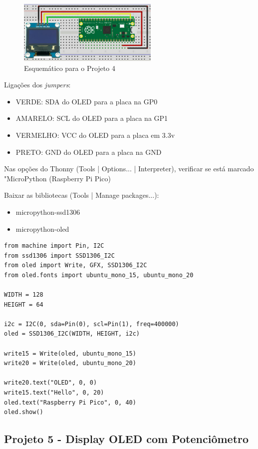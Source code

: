 \documentclass[a4paper,11pt]{article}
\begin{document}
\begin{figure}[H]
	\centering
	\includegraphics[width=0.6\textwidth]{imagem/PicoProj4}
	\caption{Esquemático para o Projeto 4}
\end{figure}

Ligações dos \textit{jumpers}: \vspace{-1em}
\begin{itemize}
	\item VERDE: SDA do OLED para a placa na GP0
	\item AMARELO: SCL do OLED para a placa na GP1
	\item VERMELHO: VCC do OLED para a placa em 3.3v
	\item PRETO: GND do OLED para a placa na GND
\end{itemize}

Nas opções do Thonny (Tools | Options... | Interpreter), verificar se está marcado "MicroPython (Raspberry Pi Pico)

Baixar as bibliotecas (Tools | Manage packages...):
\begin{itemize}
	\item micropython-ssd1306
	\item micropython-oled
\end{itemize}

\begin{lstlisting}
from machine import Pin, I2C
from ssd1306 import SSD1306_I2C
from oled import Write, GFX, SSD1306_I2C
from oled.fonts import ubuntu_mono_15, ubuntu_mono_20

WIDTH = 128
HEIGHT = 64

i2c = I2C(0, sda=Pin(0), scl=Pin(1), freq=400000)
oled = SSD1306_I2C(WIDTH, HEIGHT, i2c)

write15 = Write(oled, ubuntu_mono_15)
write20 = Write(oled, ubuntu_mono_20)

write20.text("OLED", 0, 0)
write15.text("Hello", 0, 20)
oled.text("Raspberry Pi Pico", 0, 40)
oled.show()
\end{lstlisting}

\subsection{Projeto 5 - Display OLED com Potenciômetro}
\end{document}
